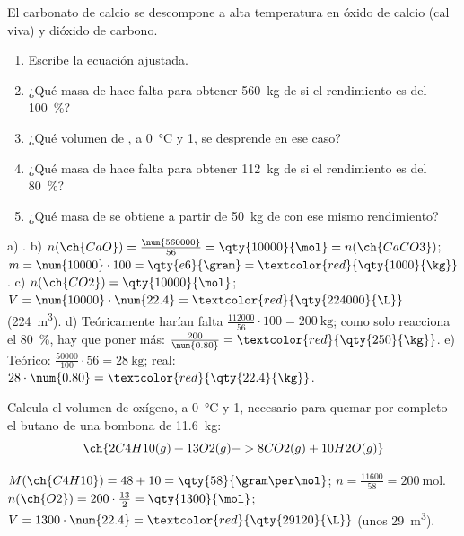 \begin{exercise}
    El carbonato de calcio se descompone a alta temperatura en óxido de calcio (cal viva) y dióxido de carbono.
    \begin{enumerate}[label=\alph*)]
        \item Escribe la ecuación ajustada.
        \item ¿Qué masa de  hace falta para obtener \qty{560}{\kg} de  si el rendimiento es del \qty{100}{\percent}?
        \item ¿Qué volumen de , a \qty{0}{\celsius} y \qty{1}{\atm}, se desprende en ese caso?
        \item ¿Qué masa de  hace falta para obtener \qty{112}{\kg} de  si el rendimiento es del \qty{80}{\percent}?
        \item ¿Qué masa de  se obtiene a partir de \qty{50}{\kg} de  con ese mismo rendimiento?
    \end{enumerate}
    \begin{solu}
        a) .
        b) \(n(\ch{CaO}) = \frac{\num{560000}}{56} = \qty{10000}{\mol} = n(\ch{CaCO3})\); \(m = \num{10000} \cdot 100 = \qty{e6}{\gram} = \textcolor{red}{\qty{1000}{\kg}}\).
        c) \(n(\ch{CO2}) = \qty{10000}{\mol}\); \(V = \num{10000} \cdot \num{22.4} = \textcolor{red}{\qty{224000}{\L}}\) (\qty{224}{\cubic\metre}).
        d) Teóricamente harían falta \(\frac{\num{112000}}{56} \cdot 100 = \qty{200}{\kg}\); como solo reacciona el \qty{80}{\percent}, hay que poner más: \(\frac{200}{\num{0.80}} = \textcolor{red}{\qty{250}{\kg}}\).
        e) Teórico: \(\frac{\num{50000}}{100} \cdot 56 = \qty{28}{\kg}\); real: \(28 \cdot \num{0.80} = \textcolor{red}{\qty{22.4}{\kg}}\).
    \end{solu}
\end{exercise}

\begin{exercise}
    Calcula el volumen de oxígeno, a \qty{0}{\celsius} y \qty{1}{\atm}, necesario para quemar por completo el butano de una bombona de \qty{11.6}{\kg}:
    \[ \ch{2 C4H10 (g) + 13 O2 (g) -> 8 CO2 (g) + 10 H2O (g)} \]
    \begin{solu}
        \(M(\ch{C4H10}) = 48 + 10 = \qty{58}{\gram\per\mol}\); \(n = \frac{\num{11600}}{58} = \qty{200}{\mol}\).
        \(n(\ch{O2}) = 200 \cdot \frac{13}{2} = \qty{1300}{\mol}\); \(V = 1300 \cdot \num{22.4} = \textcolor{red}{\qty{29120}{\L}}\) (unos \qty{29}{\cubic\metre}).
    \end{solu}
\end{exercise}

